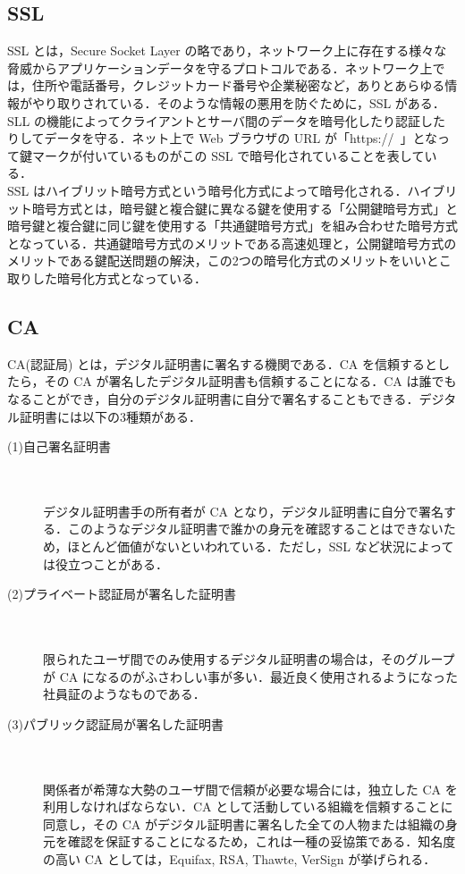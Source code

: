 \documentclass[a4j,titlepage]{jarticle}
\begin{document}
\subsection{SSL}
SSL とは，Secure Socket Layer の略であり，ネットワーク上に存在する様々な脅威からアプリケーションデータを守るプロトコルである．ネットワーク上では，住所や電話番号，クレジットカード番号や企業秘密など，ありとあらゆる情報がやり取りされている．そのような情報の悪用を防ぐために，SSL がある．SLL の機能によってクライアントとサーバ間のデータを暗号化したり認証したりしてデータを守る．ネット上で Web ブラウザの URL が「https://~」となって鍵マークが付いているものがこの SSL で暗号化されていることを表している．\\
SSL はハイブリット暗号方式という暗号化方式によって暗号化される．ハイブリット暗号方式とは，暗号鍵と複合鍵に異なる鍵を使用する「公開鍵暗号方式」と暗号鍵と複合鍵に同じ鍵を使用する「共通鍵暗号方式」を組み合わせた暗号方式となっている．共通鍵暗号方式のメリットである高速処理と，公開鍵暗号方式のメリットである鍵配送問題の解決，この2つの暗号化方式のメリットをいいとこ取りした暗号化方式となっている\cite{bib:ssltext}．

\subsection{CA}
CA(認証局) とは，デジタル証明書に署名する機関である．CA を信頼するとしたら，その CA が署名したデジタル証明書も信頼することになる．CA は誰でもなることができ，自分のデジタル証明書に自分で署名することもできる．デジタル証明書には以下の3種類がある．\\

\begin{description}
\item[(1)自己署名証明書]\\ \mbox{}\\
デジタル証明書手の所有者が CA となり，デジタル証明書に自分で署名する．このようなデジタル証明書で誰かの身元を確認することはできないため，ほとんど価値がないといわれている．ただし，SSL など状況によっては役立つことがある．
  
\item[(2)プライベート認証局が署名した証明書]\\ \mbox{}\\
限られたユーザ間でのみ使用するデジタル証明書の場合は，そのグループが CA になるのがふさわしい事が多い．最近良く使用されるようになった社員証のようなものである．
  
\item[(3)パブリック認証局が署名した証明書]\\ \mbox{}\\
関係者が希薄な大勢のユーザ間で信頼が必要な場合には，独立した CA を利用しなければならない．CA として活動している組織を信頼することに同意し，その CA がデジタル証明書に署名した全ての人物または組織の身元を確認を保証することになるため，これは一種の妥協策である．知名度の高い CA としては，Equifax, RSA, Thawte, VerSign が挙げられる．
\end{description}
\end{document}
